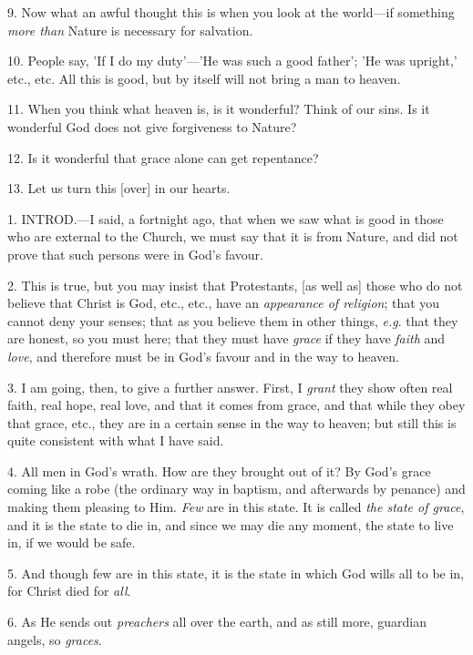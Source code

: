9. Now what an awful thought this is when you
look at the world—if something \emph{more than} Nature is necessary
for salvation.

10. People say, 'If I do my duty'—'He was such
a good father'; 'He was upright,' etc., etc. All this is good, but by
itself will not bring a man to heaven.

11. When you think what heaven is, is it
wonderful? Think of our sins. Is it wonderful God does not give
forgiveness to Nature?

12. Is it wonderful that grace alone can get
repentance?

13. Let us turn this [over] in our hearts.


1. INTROD.—I
said, a fortnight ago, that when we saw what is good in those who are
external to the Church, we must say that it is from Nature, and did
not prove that such persons were in God's favour.

2. This is true, but you may insist that
Protestants, [as well as] those who do not believe that Christ is God,
etc., etc., have an \emph{appearance of religion}; that you cannot
deny your senses; that as you believe them in other things, \emph{e.g}.
that they are honest, so you must here; that they must have \emph{grace}
if they have \emph{faith} and \emph{love}, and therefore must be in
God's favour and in the way to heaven.

3. I am going, then, to give a further answer.
First, I \emph{grant} they show often real faith, real hope, real
love, and that it comes from grace, and that while they obey that
grace, etc., they are in a certain sense in the way to heaven; but
still this is quite consistent with what I have said.

4. All men in God's wrath. How are they brought
out of it? By God's grace coming like a robe (the ordinary way in
baptism, and afterwards by penance) and making them pleasing to Him. \emph{Few}
are in this state. It is called \emph{the state of grace}, and it is
the state to die in, and since we may die any moment, the state to
live in, if we would be safe.

5. And though few are in this state, it is the
state in which God wills all to be in, for Christ died for \emph{all}.

6. As He sends out \emph{preachers} all over the
earth, and as still more, guardian angels, so \emph{graces}.

